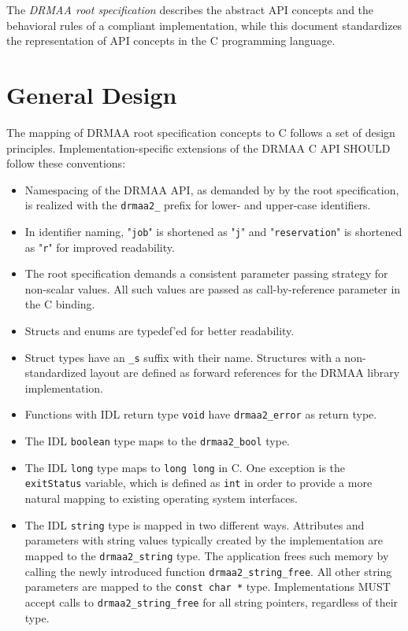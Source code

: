 \documentclass{article}
\newcommand{\h}[1]{\texttt{#1}}
\newcommand{\rat}[1]{}
\begin{document}
The \emph{DRMAA root specification} \cite{gfd194} describes the abstract API concepts and the behavioral rules of a compliant implementation, while this document standardizes the representation of API concepts in the C programming language.

\section{General Design}
\label{sec:concepts}

The mapping of DRMAA root specification concepts to C follows a set of design principles. Implementation-specific extensions of the DRMAA C API SHOULD follow these conventions:

\begin{itemize}
\item Namespacing of the DRMAA API, as demanded by by the root specification, is realized with the \h{drmaa2\_} prefix for lower- and upper-case identifiers.
\item In identifier naming, "\h{job}" is shortened as "\h{j}" and "\h{reservation}" is shortened as "\h{r}" for improved readability.
\item The root specification demands a consistent parameter passing strategy for non-scalar values. All such values are passed as call-by-reference parameter in the C binding.
\item Structs and enums are typedef'ed for better readability.
\item Struct types have an \h{\_s} suffix with their name. Structures with a non-standardized layout are defined as forward references for the DRMAA library implementation. \rat{This avoids the usage of void* pointers, f.e. with dictionaries and lists.}
\item Functions with IDL return type \h{void} have \h{drmaa2\_error} as return type.
\item The IDL \h{boolean} type maps to the \h{drmaa2\_bool} type.
\item The IDL  \h{long} type maps to \h{long long} in C. One exception is the \h{exitStatus} variable, which is defined as \h{int} in order to provide a more natural mapping to existing operating system interfaces.
\item The IDL \h{string} type is mapped in two different ways. Attributes and parameters with string values typically created by the implementation are mapped to the \h{drmaa2\_string} type. The application frees such memory by calling the newly introduced function \h{drmaa2\_string\_free}. All other string parameters are mapped to the \h{const char *} type. Implementations MUST accept calls to \h{drmaa2\_string\_free} for all string pointers, regardless of their type. \rat{This means that even if the implementation returns string literal pointers at some occasions, \h{drmaa2\_string\_free} SHALL not fail for this. This may be realized by avoiding string literal pointers at all, or by maintaining a list of malloced pointers.}

\end{itemize}
\end{document}
